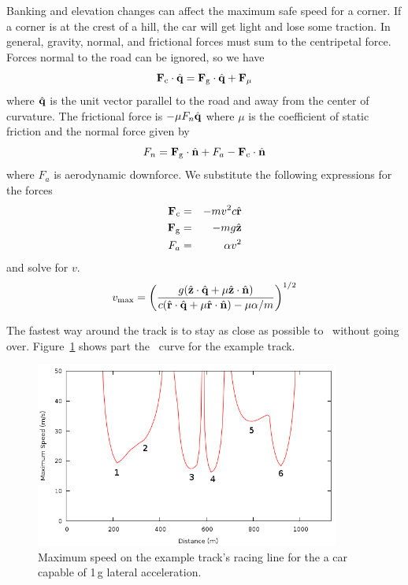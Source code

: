 \documentclass{article}
\begin{document}
Banking and elevation changes can affect the maximum safe speed for a corner.
If a corner is at the crest of a hill, the car will get light and lose some
traction.  In general, gravity, normal, and frictional forces must sum to the
centripetal force.  Forces normal to the road can be ignored, so we have
\begin{equation}
   \mathbf{F}_{\mathrm{c}}\cdot\hat{\mathbf{q}} = \mathbf{F}_{\mathrm{g}}\cdot\hat{\mathbf{q}} + \mathbf{F}_{\mathrm{\mu}}
\end{equation}
where $\hat{\mathbf{q}}$ is the unit vector parallel to the road and away from the center
of curvature.  The frictional force is $-\mu F_n \hat{\mathbf{q}}$ where $\mu$ is the
coefficient of static friction and the normal force
given by
\begin{equation}
  F_n = \mathbf{F}_{\mathrm{g}}\cdot\hat{\mathbf{n}} + F_a - \mathbf{F}_{\mathrm{c}}\cdot\hat{\mathbf{n}}
  \label{eq:normal-force}
\end{equation}
where $F_a$ is aerodynamic downforce.  We substitute the following expressions
for the forces
\begin{eqnarray}
  \mathbf{F}_{\mathrm{c}} & = & -mv^2c\hat{\mathbf{r}} \label{eq:centripetal-force} \\
  \mathbf{F}_{\mathrm{g}} & = & -mg\hat{\mathbf{z}} \label{eq:gravitational-force} \\
  F_a & = & \alpha v^2 \label{eq:downforce}
\end{eqnarray}
and solve for $v$.
\begin{equation}
  v_\mathrm{max} = \left(\frac{g(\hat{\mathbf{z}}\cdot\hat{\mathbf{q}} +
      \mu\hat{\mathbf{z}}\cdot\hat{\mathbf{n}})}{c(\hat{\mathbf{r}}\cdot\hat{\mathbf{q}} +
      \mu\hat{\mathbf{r}}\cdot\hat{\mathbf{n}}) - \mu\alpha/m}\right)^{1/2}
\end{equation}

The fastest way around the track is to stay as close as possible to \vmax\
without going over.  Figure~\ref{fig:v-max} shows part the \vmax\ curve for the
example track.

\begin{figure}
  \centering
  \includegraphics[width=10cm]{v-max.png}  
  \caption{Maximum speed on the example track's racing line for the a car capable
    of 1\,g lateral acceleration.}
  \label{fig:v-max}
\end{figure}
\end{document}

